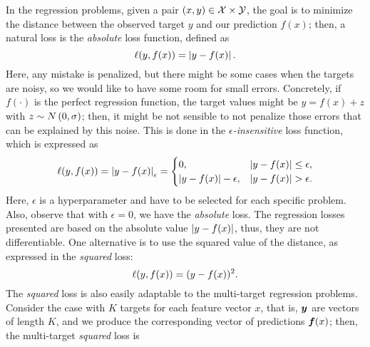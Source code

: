 In the regression problems, given a pair $(x, y) \in \mathcal{X} \times \mathcal{Y}$, the goal is to minimize the distance between the observed target $y$ and our prediction $f(x)$; then, a natural loss is the \emph{absolute} loss function, defined as 
\begin{equation}
    \label{eq:abs_def}
    \lossf(y, f(x)) = \abs{y - f(x)}.
\end{equation}
Here, any mistake is penalized, but there might be some cases when the targets are noisy, so we would like to have some room for small errors. Concretely, if $f(\cdot)$ is the perfect regression function, the target values might be $y = f(x) + z$ with $z \sim N \left(0, \sigma\right)$; then, it might be not sensible to not penalize those errors that can be explained by this noise. This is done in the \emph{$\epsilon$-insensitive} loss function, which is expressed as 
\begin{equation}
    \label{eq:epsins_def}
    \lossf(y, f(x)) = \abs{y - f(x)}_\epsilon =
    \begin{cases}
        0, & \abs{y - f(x)} \leq \epsilon ,\\
        \abs{y - f(x)} - \epsilon, & \abs{y - f(x)} > \epsilon .\\
    \end{cases}
\end{equation} 
Here, $\epsilon$ is a hyperparameter and have to be selected for each specific problem. Also, observe that with $\epsilon =0$, we have the \emph{absolute} loss.
%
The regression losses presented are based on the absolute value $\left|y - f(x)\right|$, thus, they are not differentiable. One alternative is to use the squared value of the distance, as expressed in the \emph{squared} loss:
\begin{equation}
    \label{eq:sq_def}
    \lossf(y, f(x)) = (y - f(x))^2.
\end{equation}
The \emph{squared} loss is also easily adaptable to the multi-target regression problems. Consider the case with $K$ targets for each feature vector $x$, that is, $\bm{y}$ are vectors of length $K$, and we produce the corresponding vector of predictions $\bm{f}(x)$; then, the multi-target \emph{squared} loss is
